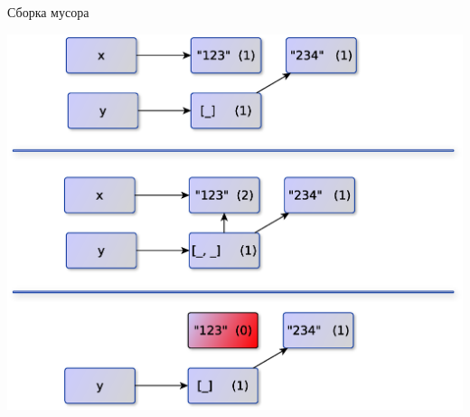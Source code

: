 \documentclass{article}
\begin{document}
\begin{center} Сборка мусора \end{center}
\begin{center} \includegraphics[scale=0.6]{images/ref_counter.eps}\end{center}
\newpage
\end{document}
